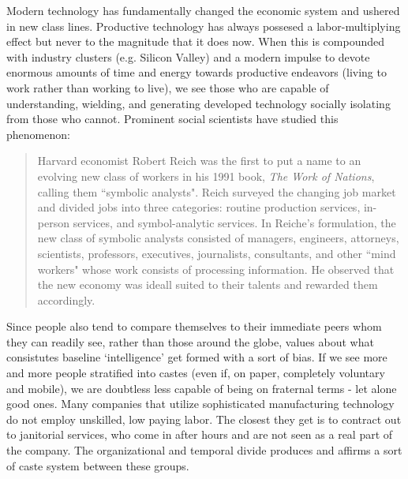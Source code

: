 \documentclass[letterpaper]{article}
\begin{document}

Modern technology has fundamentally changed the economic system and ushered in new class lines. Productive technology has always possesed a labor-multiplying effect but never to the magnitude that it does now. When this is compounded with industry clusters (e.g. Silicon Valley) and a modern impulse to devote enormous amounts of time and energy towards productive endeavors (living to work rather than working to live), we see those who are capable of understanding, wielding, and generating developed technology socially isolating from those who cannot. Prominent social scientists have studied this phenomenon:

\begin{quote}
  Harvard economist Robert Reich was the first to put a name to an evolving new class of workers in his 1991 book, \textit{The Work of Nations}, calling them ``symbolic analysts". Reich surveyed the changing job market and divided jobs into three categories: routine production services, in-person services, and symbol-analytic services. In Reiche's formulation, the new class of symbolic analysts consisted of managers, engineers, attorneys, scientists, professors, executives, journalists, consultants, and other ``mind workers" whose work consists of processing information. He observed that the new economy was ideall suited to their talents and rewarded them accordingly.
\end{quote}


Since people also tend to compare themselves to their immediate peers whom they can readily see, rather than those around the globe, values about what consistutes baseline `intelligence' get formed with a sort of bias. If we see more and more people stratified into castes (even if, on paper, completely voluntary and mobile), we are doubtless less capable of being on fraternal terms - let alone good ones. Many companies that utilize sophisticated manufacturing technology do not employ unskilled, low paying labor. The closest they get is to contract out to janitorial services, who come in after hours and are not seen as a real part of the company. The organizational and temporal divide produces and affirms a sort of caste system between these groups.
\end{document}
